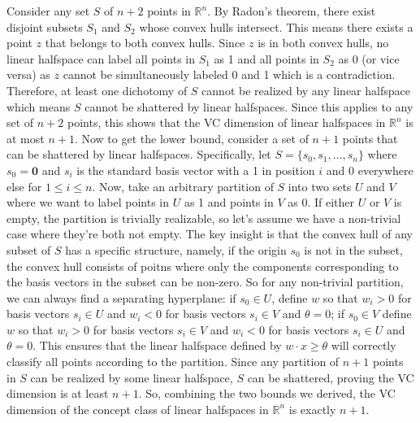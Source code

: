 \documentclass[11pt]{article}
\DeclareMathOperator{\1}{\mathbbm{1}}
\begin{document}
Consider any set $S$ of $n+2$ points in $\mathbb{R}^n$. By Radon's theorem, there exist disjoint subsets $S_1$ and $S_2$ whose convex hulls intersect. This means there exists a point $z$ that belongs to both convex hulls. Since $z$ is in both convex hulls, no linear halfspace can label all points in $S_1$ as 1 and all points in $S_2$ as 0 (or vice versa) as $z$ cannot be simultaneously labeled 0 and 1 which is a contradiction. Therefore, at least one dichotomy of $S$ cannot be realized by any linear halfspace which means $S$ cannot be shattered by linear halfspaces. Since this applies to any set of $n+2$ points, this shows that the VC dimension of linear halfspaces in $\mathbb{R}^n$ is at most $n+1$. Now to get the lower bound, consider a set of $n+1$ points that can be shattered by linear halfspaces. Specifically, let $S = \{s_0, s_1, \ldots, s_n\}$ where $s_0=\mathbf{0}$ and $s_i$ is the standard basis vector with a 1 in position $i$ and 0 everywhere else for $1 \leq i \leq n$. Now, take an arbitrary partition of $S$ into two sets $U$ and $V$ where we want to label points in $U$ as 1 and points in $V$ as 0. If either $U$ or $V$ is empty, the partition is trivially realizable, so let's assume we have a non-trivial case where they're both not empty. The key insight is that the convex hull of any subset of $S$ has a specific structure, namely, if the origin $s_0$ is not in the subset, the convex hull consists of poitns where only the components corresponding to the basis vectors in the subset can be non-zero. So for any non-trivial partition, we can always find a separating hyperplane: if $s_0 \in U$, define $w$ so that $w_i > 0$ for basis vectors $s_i \in U$ and $w_i < 0$ for basis vectors $s_i \in V$ and $\theta = 0$; if $s_0 \in V$ define $w$ so that $w_i > 0$ for basis vectors $s_i \in V$ and $w_i < 0$ for basis vectors $s_i \in U$ and $\theta = 0$. This ensures that the linear halfspace defined by $w \cdot x \geq \theta$ will correctly classify all points according to the partition. Since any partition of $n+1$ points in $S$ can be realized by some linear halfspace, $S$ can be shattered, proving the VC dimension is at least $n+1$. So, combining the two bounds we derived, the VC dimension of the concept class of linear halfspaces in $\mathbb{R}^n$ is exactly $n+1$.
\end{document}
